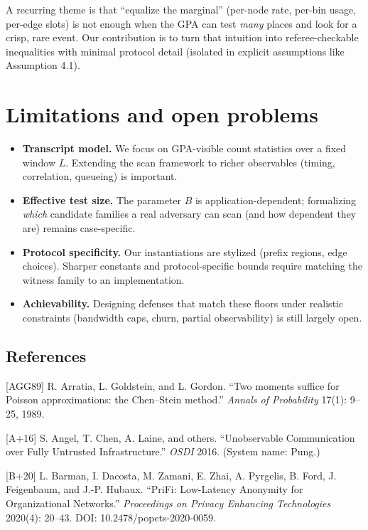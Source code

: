 \documentclass[
 11pt,
]{article}
\providecommand{\tightlist}{%
 \setlength{\itemsep}{0pt}\setlength{\parskip}{0pt}}
\begin{document}
A recurring theme is that ``equalize the marginal'' (per-node rate,
per-bin usage, per-edge slots) is not enough when the GPA can test
\emph{many} places and look for a crisp, rare event. Our contribution is
to turn that intuition into referee-checkable inequalities with minimal
protocol detail (isolated in explicit assumptions like Assumption 4.1).

\section{Limitations and open problems}\label{limitations}

\begin{itemize}\tightlist
\item \textbf{Transcript model.} We focus on GPA-visible count statistics over a fixed window $L$.
Extending the scan framework to richer observables (timing, correlation, queueing) is important.
\item \textbf{Effective test size.} The parameter $B$ is application-dependent; formalizing \emph{which}
candidate families a real adversary can scan (and how dependent they are) remains case-specific.
\item \textbf{Protocol specificity.} Our instantiations are stylized (prefix regions, edge choices).
Sharper constants and protocol-specific bounds require matching the witness family to an implementation.
\item \textbf{Achievability.} Designing defenses that match these floors under realistic constraints
(bandwidth caps, churn, partial observability) is still largely open.
\end{itemize}

\subsection{References}\label{references}

{[}AGG89{]} R. Arratia, L. Goldstein, and L. Gordon. ``Two moments
suffice for Poisson approximations: the Chen--Stein method.''
\emph{Annals of Probability} 17(1): 9--25, 1989.

{[}A+16{]} S. Angel, T. Chen, A. Laine, and others. ``Unobservable
Communication over Fully Untrusted Infrastructure.'' \emph{OSDI} 2016.
(System name: Pung.)

{[}B+20{]} L. Barman, I. Dacosta, M. Zamani, E. Zhai, A. Pyrgelis, B.
Ford, J. Feigenbaum, and J.-P. Hubaux. ``PriFi: Low-Latency Anonymity
for Organizational Networks.'' \emph{Proceedings on Privacy Enhancing
Technologies} 2020(4): 20--43. DOI: 10.2478/popets-2020-0059.
\end{document}
